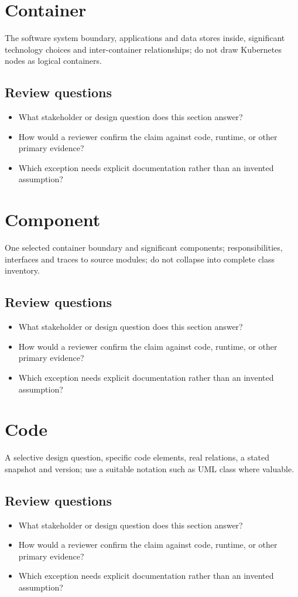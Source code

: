 \documentclass[10pt,letterpaper]{article}
\begin{document}
\section{Container}
The software system boundary, applications and data stores inside, significant technology choices and inter-container relationships; do not draw Kubernetes nodes as logical containers.


\subsection{Review questions}
\begin{itemize}
\item What stakeholder or design question does this section answer?
\item How would a reviewer confirm the claim against code, runtime, or other primary evidence?
\item Which exception needs explicit documentation rather than an invented assumption?
\end{itemize}

\section{Component}
One selected container boundary and significant components; responsibilities, interfaces and traces to source modules; do not collapse into complete class inventory.


\subsection{Review questions}
\begin{itemize}
\item What stakeholder or design question does this section answer?
\item How would a reviewer confirm the claim against code, runtime, or other primary evidence?
\item Which exception needs explicit documentation rather than an invented assumption?
\end{itemize}

\section{Code}
A selective design question, specific code elements, real relations, a stated snapshot and version; use a suitable notation such as UML class where valuable.


\subsection{Review questions}
\begin{itemize}
\item What stakeholder or design question does this section answer?
\item How would a reviewer confirm the claim against code, runtime, or other primary evidence?
\item Which exception needs explicit documentation rather than an invented assumption?
\end{itemize}
\end{document}
